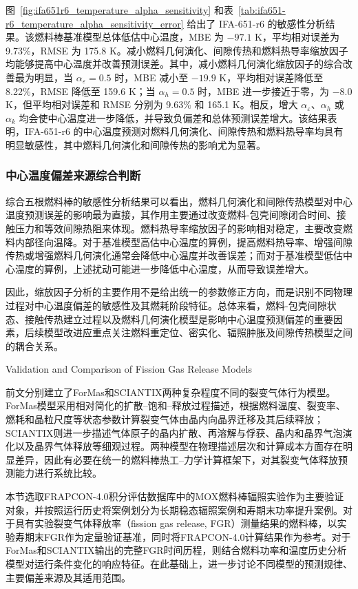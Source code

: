 图~\ref{fig:ifa651r6_temperature_alpha_sensitivity} 和表~\ref{tab:ifa651-r6_temperature_alpha_sensitivity_error} 给出了 IFA-651-r6 的敏感性分析结果。该燃料棒基准模型总体低估中心温度，MBE 为 \(-97.1\) K，平均相对误差为 9.73\%，RMSE 为 175.8 K。减小燃料几何演化、间隙传热和燃料热导率缩放因子均能够提高中心温度并改善预测误差。其中，减小燃料几何演化缩放因子的综合改善最为明显，当 \(\alpha_{\varepsilon}=0.5\) 时，MBE 减小至 \(-19.9\) K，平均相对误差降低至 8.22\%，RMSE 降低至 159.6 K；当 \(\alpha_h=0.5\) 时，MBE 进一步接近于零，为 \(-8.0\) K，但平均相对误差和 RMSE 分别为 9.63\% 和 165.1 K。相反，增大 \(\alpha_{\varepsilon}\)、\(\alpha_h\) 或 \(\alpha_k\) 均会使中心温度进一步降低，并导致负偏差和总体预测误差增大。该结果表明，IFA-651-r6 的中心温度预测对燃料几何演化、间隙传热和燃料热导率均具有明显敏感性，其中燃料几何演化和间隙传热的影响尤为显著。

\subsubsection{中心温度偏差来源综合判断}

综合五根燃料棒的敏感性分析结果可以看出，燃料几何演化和间隙传热模型对中心温度预测误差的影响最为直接，其作用主要通过改变燃料-包壳间隙闭合时间、接触压力和等效间隙热阻来体现。燃料热导率缩放因子的影响相对稳定，主要改变燃料内部径向温降。对于基准模型高估中心温度的算例，提高燃料热导率、增强间隙传热或增强燃料几何演化通常会降低中心温度并改善误差；而对于基准模型低估中心温度的算例，上述扰动可能进一步降低中心温度，从而导致误差增大。

因此，缩放因子分析的主要作用不是给出统一的参数修正方向，而是识别不同物理过程对中心温度偏差的敏感性及其燃耗阶段特征。总体来看，燃料-包壳间隙状态、接触传热建立过程以及燃料几何演化模型是影响中心温度预测偏差的重要因素，后续模型改进应重点关注燃料重定位、密实化、辐照肿胀及间隙传热模型之间的耦合关系。

{Validation and Comparison of Fission Gas Release Models}

前文分别建立了ForMas和SCIANTIX两种复杂程度不同的裂变气体行为模型。ForMas模型采用相对简化的扩散--饱和--释放过程描述，根据燃料温度、裂变率、燃耗和晶粒尺度等状态参数计算裂变气体由晶内向晶界迁移及其后续释放；SCIANTIX则进一步描述气体原子的晶内扩散、再溶解与俘获、晶内和晶界气泡演化以及晶界气体释放等细观过程。两种模型在物理描述层次和计算成本方面存在明显差异，因此有必要在统一的燃料棒热工--力学计算框架下，对其裂变气体释放预测能力进行系统比较。

本节选取FRAPCON-4.0积分评估数据库中的MOX燃料棒辐照实验作为主要验证对象，并按照运行历史将案例划分为长期稳态辐照案例和寿期末功率提升案例。对于具有实验裂变气体释放率（fission gas release, FGR）测量结果的燃料棒，以实验寿期末FGR作为定量验证基准，同时将FRAPCON-4.0计算结果作为参考。对于ForMas和SCIANTIX输出的完整FGR时间历程，则结合燃料功率和温度历史分析模型对运行条件变化的响应特征。在此基础上，进一步讨论不同模型的预测规律、主要偏差来源及其适用范围。

